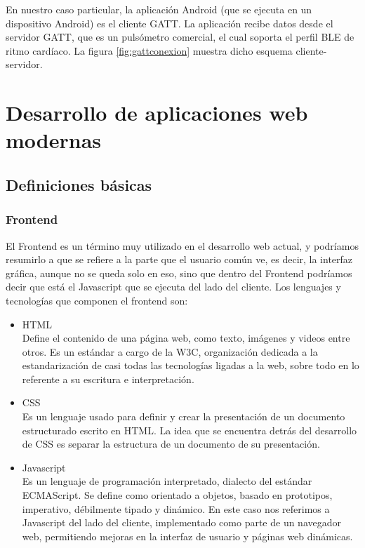 En nuestro caso particular, la aplicación Android (que se ejecuta en un dispositivo Android) es el cliente GATT. La aplicación recibe datos desde el servidor GATT, que es un pulsómetro comercial, el cual soporta el perfil BLE de ritmo cardíaco. La figura \ref{fig:gattconexion} muestra dicho esquema cliente-servidor.

\section{Desarrollo de aplicaciones web modernas}

\subsection{Definiciones básicas}

\subsubsection{Frontend}
El Frontend es un término muy utilizado en el desarrollo web actual, y podríamos resumirlo a que se refiere a la parte que el usuario común ve, es decir, la interfaz gráfica, aunque no se queda solo en eso, sino que dentro del Frontend podríamos decir que está el Javascript que se ejecuta del lado del cliente. Los lenguajes y tecnologías que componen el frontend son:

\begin{itemize}
\item \ac{HTML} \\ Define el contenido de una página web, como texto, imágenes y videos entre otros. Es un estándar a cargo de la W3C, organización dedicada a la estandarización de casi todas las tecnologías ligadas a la web, sobre todo en lo referente a su escritura e interpretación.
\item \ac{CSS} \\ Es un lenguaje usado para definir y crear la presentación de un documento estructurado escrito en HTML. La idea que se encuentra detrás del desarrollo de CSS es separar la estructura de un documento de su presentación.
\item Javascript \\ Es un lenguaje de programación interpretado, dialecto del estándar ECMAScript. Se define como orientado a objetos, basado en prototipos, imperativo, débilmente tipado y dinámico. En este caso nos referimos a Javascript del lado del cliente, implementado como parte de un navegador web, permitiendo mejoras en la interfaz de usuario y páginas web dinámicas.
\end{itemize}


